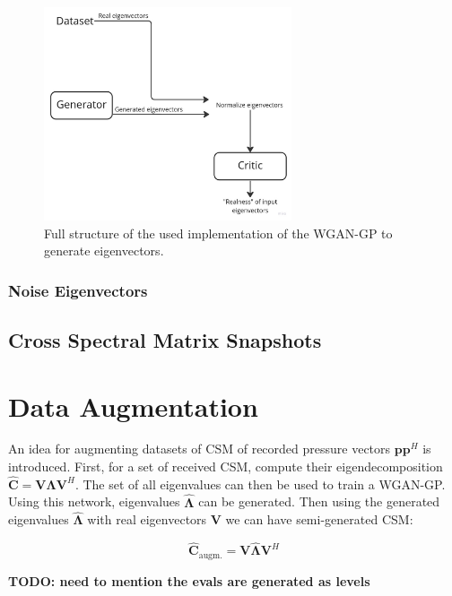 \documentclass[11pt,a4paper,twoside]{report}
\begin{document}
\begin{figure}
    \centering
    \includegraphics[width=0.65\textwidth]{figs/flowchart_evecs_wgangp.jpg}
    \caption{Full structure of the used implementation of the WGAN-GP to generate eigenvectors.}
    \label{fig:flowchart_evecs_wgangp}
\end{figure}

\subsubsection{Noise Eigenvectors}

\subsection{Cross Spectral Matrix Snapshots}

\section{Data Augmentation}

An idea for augmenting datasets of CSM of recorded pressure vectors $\mathbf{p} \mathbf{p}^H$ is introduced. First, for a set of received CSM, compute their eigendecomposition $\mathbf{\hat{C}} = \mathbf{V} \mathbf{\Lambda} \mathbf{V}^H$. The set of all eigenvalues can then be used to train a WGAN-GP. Using this network, eigenvalues $\hat{\mathbf{\Lambda}}$ can be generated. Then using the generated eigenvalues $\hat{\mathbf{\Lambda}}$ with real eigenvectors $\mathbf{V}$ we can have semi-generated CSM:

\begin{equation}
    \mathbf{\hat{C}}_\text{augm.}  = \mathbf{V} \hat{\mathbf{\Lambda}} \mathbf{V}^H
\end{equation}

\textbf{TODO: need to mention the evals are generated as levels}
\end{document}
